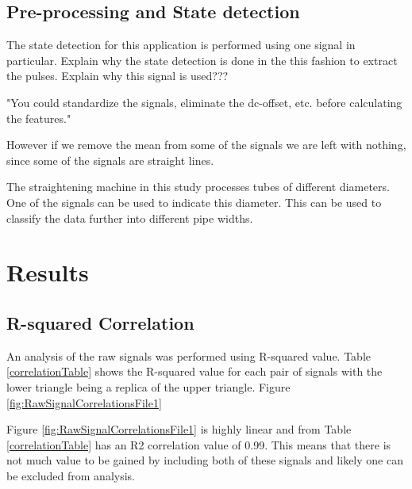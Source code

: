 \documentclass{article}
\begin{document}
\subsection{Pre-processing and State detection}
The state detection for this application is performed using one signal in particular. 
Explain why the state detection is done in the this fashion to extract the pulses.
Explain why this signal is used???

"You could standardize the signals, eliminate the dc-offset, etc. before calculating the features."

However if we remove the mean from some of the signals we are left with nothing, since some of the signals are straight lines.

The straightening machine in this study processes tubes of different diameters. One of the signals can be used to indicate this diameter. This can be used to classify the data further into different pipe widths.
\section{Results}
\subsection{R-squared Correlation}
An analysis of the raw signals was performed using R-squared value. Table \ref{correlationTable} shows the R-squared value for each pair of signals with the lower triangle being a replica of the upper triangle. 
Figure \ref{fig:RawSignalCorrelationsFile1}
\begin{center}
    
\label{correlationTable}
\end{center}
Figure \ref{fig:RawSignalCorrelationsFile1} is highly linear and from Table \ref{correlationTable} has an R2 correlation value of 0.99. This means that there is not much value to be gained by including both of these signals and likely one can be excluded from analysis.
\end{document}
